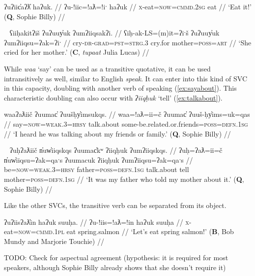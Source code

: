 \ex \label{ex:eateat}
\begingl
\glpreamble ʔuʔiic̓aʔƛ̓ haʔuk. //
\gla ʔu-!iic=!aƛ=!iˑ haʔuk //
\glb \textsc{x}-eat=\textsc{now}=\textsc{cmmd.2sg} eat //
\glft `Eat it!' (\textbf{Q}, Sophie Billy) //
\endgl
\xe

\ex~ \label{ex:crycry}
\begingl
\glpreamble ʕiiḥakitʔiš ʔuʔuuy̓uk ʔumʔiiqsakʔi. //
\gla ʕiḥ-ak-LS=(m)it=ʔiˑš ʔuʔuuy̓uk ʔumʔiiqsu=ʔak=ʔiˑ //
\glb cry-\textsc{dr}-\textsc{grad}=\textsc{pst}=\textsc{strg.3} cry.for mother=\textsc{poss}=\textsc{art} //
\glft `She cried for her mother.' (\textbf{C}, \textit{tupaat} Julia Lucas) //
\endgl
\xe

While \textit{waa} `say' can be used as a transitive quotative, it can be used intransitively as well, similar to English \textit{speak}. It can enter into this kind of SVC in this capacity, doubling with another verb of speaking (\ref{ex:sayabout}). This characteristic doubling can also occur with \textit{ʔiiqḥuk} `tell' (\ref{ex:talkabout}).

\ex \label{ex:sayabout}
\begingl
\glpreamble waaʔaƛiič ʔuumac̓ ʔuušḥy̓imsukqs. //
\gla waa=!aƛ=ii=č ʔuumac̓ ʔuuš-ḥy̓ims=uk=qas //
\glb say=\textsc{now}=\textsc{weak.3}=\textsc{hrsy} talk.about some-be.related.or.friends=\textsc{poss}=\textsc{defn.1sg} //
\glft `I heard he was talking about my friends or family.' (\textbf{Q}, Sophie Billy) //
\endgl
\xe

\ex~ \label{ex:talkabout}
\begingl
\glpreamble ʔuḥʔaƛiič n̓uw̓iiqskqs ʔuumac̓kʷ ʔiiqḥuk ʔumʔiiqskqs. //
\gla ʔuḥ=ʔaƛ=ii=č n̓uw̓iiqsu=ʔak=qaˑs ʔuumacuk ʔiiqḥuk ʔumʔiiqsu=ʔak=qaˑs //
\glb be=\textsc{now}=\textsc{weak.3}=\textsc{hrsy} father=\textsc{poss}=\textsc{defn.1sg} talk.about tell mother=\textsc{poss}=\textsc{defn.1sg} //
\glft `It was my father who told my mother about it.' (\textbf{Q}, Sophie Billy) //
\endgl
\xe

Like the other SVCs, the transitive verb can be separated from its object.

\ex \label{ex:eateat2}
\begingl
\glpreamble ʔuʔiisʔaƛ̓in haʔuk suuḥa. //
\gla ʔu-!iis=!aƛ=!in haʔuk suuḥa //
\glb \textsc{x}-eat=\textsc{now}=\textsc{cmmd.1pl} eat spring.salmon //
\glft `Let's eat spring salmon!' (\textbf{B}, Bob Mundy and Marjorie Touchie) //
\endgl
\xe

TODO: Check for aspectual agreement (hypothesis: it is required for most speakers, although Sophie Billy already shows that she doesn't require it)

\vspace{10pt}

